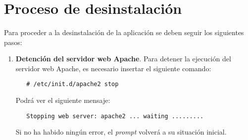 \section{Proceso de desinstalación}

  \paragraph{}Para proceder a la desinstalación de la aplicación se deben seguir
  los siguientes pasos:

  \begin{enumerate}
   \item \textbf{Detención del servidor web Apache}.
   Para detener la ejecución del servidor web Apache, es necesario insertar
   el siguiente comando:
   \begin{verbatim}
   # /etc/init.d/apache2 stop
   \end{verbatim}
   Podrá ver el siguiente mensaje:
   \begin{verbatim}
   Stopping web server: apache2 ... waiting .........
   \end{verbatim}
   Si no ha habido ningún error, el \textit{prompt} volverá a su situación
   inicial.
  \end{enumerate}
